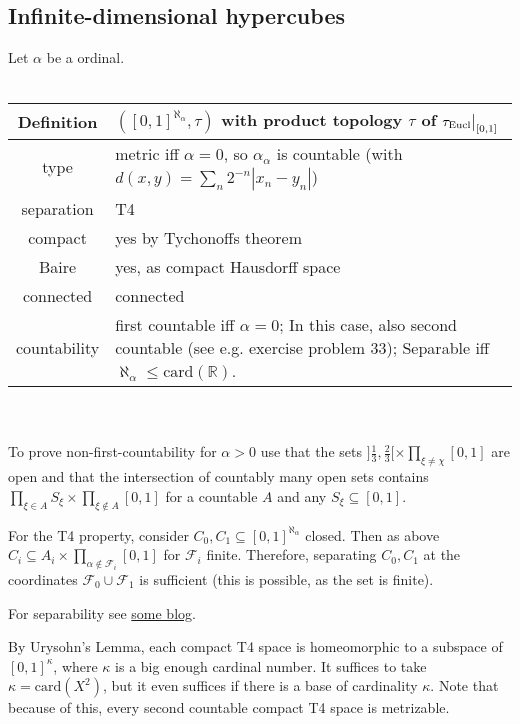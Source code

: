 \documentclass{scrartcl}
\newcommand{\R}{\mathbb{R}}
\newcommand\restr[2]{{
    \left.\kern-\nulldelimiterspace
    #1
    \vphantom{\big|}
    \right|_{#2}
}}
\begin{document}
\subsection{Infinite-dimensional hypercubes}
\label{top:hypercube}
Let $\alpha$ be a ordinal.
\\\\
\begin{tabular}{c | p{}}
    Definition & $([0, 1]^{\aleph_\alpha}, \tau)$ with product topology $\tau$ of $\restr{\tau_{\mathrm{Eucl}}}{[0, 1]}$ \\
    \hline
    type & metric iff $\alpha = 0$, so $\alpha_\alpha$ is countable (with $d(x,y) = \sum_n 2^{-n}|x_n - y_n|$) \\
    separation & T4 \\
    compact & yes by Tychonoffs theorem \\
    Baire & yes, as compact Hausdorff space \\
    connected & connected \\
    countability & first countable iff $\alpha = 0$; In this case, also second countable (see e.g. exercise problem 33); Separable iff $\aleph_\alpha \leq \mathrm{card}(\R)$.
\end{tabular}
\\\\
To prove non-first-countability for $\alpha > 0$ use that the sets $]\frac 1 3, \frac 2 3[ \times \prod_{\xi \neq \chi} [0, 1]$ are open and that the intersection of countably many open sets contains $\prod_{\xi \in A} S_\xi \times \prod_{\xi \notin A} [0, 1]$ for a countable $A$ and any $S_\xi \subseteq [0, 1]$.

For the T4 property, consider $C_0, C_1 \subseteq [0,1]^{\aleph_\alpha}$ closed. Then as above $C_i \subseteq A_i \times \prod_{\alpha \notin \mathcal{F}_i} [0,1]$ for $\mathcal{F}_i$ finite. Therefore, separating $C_0, C_1$ at the coordinates $\mathcal{F}_0 \cup \mathcal{F}_1$ is sufficient (this is possible, as the set is finite).

For separability see \href{https://dantopology.wordpress.com/2009/11/06/product-of-separable-spaces/}{some blog}.

By Urysohn's Lemma, each compact T4 space is homeomorphic to a subspace of $[0, 1]^\kappa$, where $\kappa$ is a big enough cardinal number. It suffices to take $\kappa = \mathrm{card}(X^2)$, but it even suffices if there is a base of cardinality $\kappa$. Note that because of this, every second countable compact T4 space is metrizable.
\end{document}
